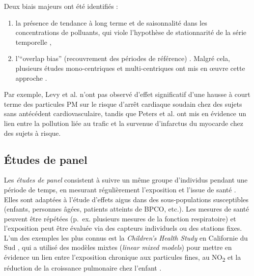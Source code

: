 Deux biais majeurs ont été identifiés : 

\begin{enumerate}
\item la présence de tendance à long terme et de saisonnalité dans les concentrations de polluants, qui viole l'hypothèse de stationnarité de la série temporelle \citep{Navidi1998,BatesonSchwartz1999,LumleyLevy2000,BatesonSchwartz2001,LevyLumleySheppard2001}, 

\item l'``overlap bias'' (recouvrement des périodes de référence) \citep{AustinFlandersRothman1989,LumleyLevy2000,JanesSheppardLumley2005a,JanesSheppardLumley2005b}. Malgré cela, plusieurs études mono-centriques et multi-centriques ont mis en œuvre cette approche \citep{SchwartzLee1999,NeasSchwartzDockery1999,PetersDockeryMuller2001,LevySheppardCheckoway2001,DIppolitiForastiereAncona2003,SymonsWangGuallar2006,ZanobettiSchwartz2005,BarnettWilliamsSchwartz2005,BarnettWilliamsSchwartz2006,MedinaRamnZanobetti2006}.
\end{enumerate}

Par exemple, Levy et al. \citep{LevySheppardCheckoway2001} n'ont pas observé d'effet significatif d'une hausse à court terme des particules PM sur le risque d'arrêt cardiaque soudain chez des sujets sans antécédent cardiovasculaire, tandis que Peters et al. \citep{PetersKlotHeier2004} ont mis en évidence un lien entre la pollution liée au trafic et la survenue d'infarctus du myocarde chez des sujets à risque.

\subsection{Études de panel}
Les \emph{études de panel} consistent à suivre un même groupe d'individus pendant une période de temps, en mesurant régulièrement l'exposition et l'issue de santé \citep{PetersAvolGauderman1999,PetersAvolNavidi1999,GaudermanMcConnellGilliland2000}. Elles sont adaptées à l'étude d'effets aigus dans des sous-populations susceptibles (enfants, personnes âgées, patients atteints de BPCO, etc.). Les mesures de santé peuvent être répétées (p.~ex. plusieurs mesures de la fonction respiratoire) et l'exposition peut être évaluée via des capteurs individuels ou des stations fixes. L'un des exemples les plus connus est la \emph{Children’s Health Study} en Californie du Sud \citep{PetersAvolNavidi1999,PetersAvolGauderman1999,GaudermanMcConnellGilliland2000}, qui a utilisé des modèles mixtes (\emph{linear mixed models}) pour mettre en évidence un lien entre l'exposition chronique aux particules fines, au NO\textsubscript{2} et la réduction de la croissance pulmonaire chez l'enfant \citep{GaudermanMcConnellGilliland2000}.

